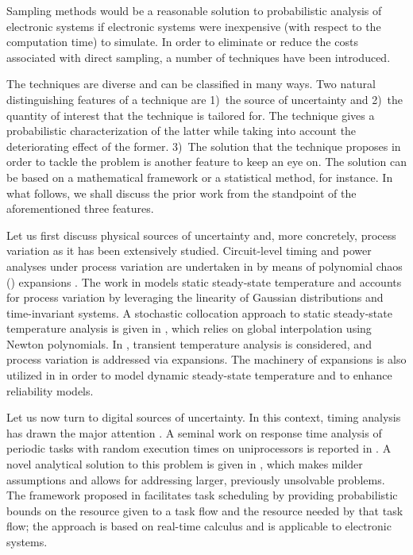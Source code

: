 Sampling methods would be a reasonable solution to probabilistic analysis of
electronic systems if electronic systems were inexpensive (with respect to the
computation time) to simulate. In order to eliminate or reduce the costs
associated with direct sampling, a number of techniques have been introduced.

The techniques are diverse and can be classified in many ways. Two natural
distinguishing features of a technique are 1)~the source of uncertainty and
2)~the quantity of interest that the technique is tailored for. The technique
gives a probabilistic characterization of the latter while taking into account
the deteriorating effect of the former. 3)~The solution that the technique
proposes in order to tackle the problem is another feature to keep an eye on.
The solution can be based on a mathematical framework or a statistical method,
for instance. In what follows, we shall discuss the prior work from the
standpoint of the aforementioned three features.

Let us first discuss physical sources of uncertainty and, more concretely,
process variation as it has been extensively studied. Circuit-level timing and
power analyses under process variation are undertaken in \cite{bhardwaj2008} by
means of polynomial chaos () expansions \cite{xiu2010}. The work in
\cite{juan2012} models static steady-state temperature and accounts for process
variation by leveraging the linearity of Gaussian distributions and
time-invariant systems. A stochastic collocation \cite{xiu2010} approach to
static steady-state temperature analysis is given in \cite{lee2013}, which
relies on global interpolation using Newton polynomials. In \cite{ukhov2014},
transient temperature analysis is considered, and process variation is addressed
via  expansions. The machinery of  expansions is also utilized in
\cite{ukhov2015} in order to model dynamic steady-state temperature
\cite{ukhov2012} and to enhance reliability models.

Let us now turn to digital sources of uncertainty. In this context, timing
analysis has drawn the major attention \cite{quinton2012}. A seminal work on
response time analysis of periodic tasks with random execution times on
uniprocessors is reported in \cite{diaz2002}. A novel analytical solution to
this problem is given in \cite{tanasa2015}, which makes milder assumptions and
allows for addressing larger, previously unsolvable problems. The framework
proposed in \cite{santinelli2011} facilitates task scheduling by providing
probabilistic bounds on the resource given to a task flow and the resource
needed by that task flow; the approach is based on real-time calculus and is
applicable to electronic systems.

